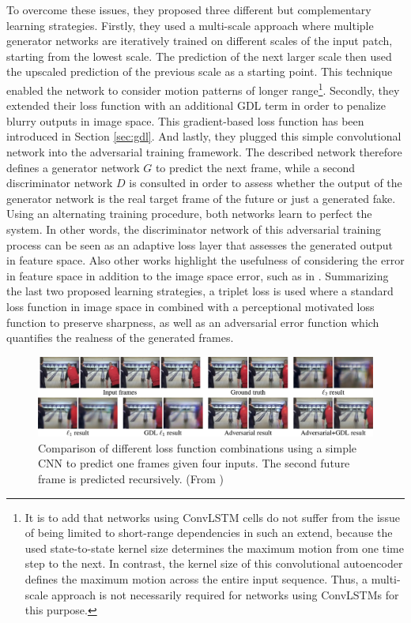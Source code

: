 To overcome these issues, they proposed three different but complementary learning strategies. Firstly, they used a multi-scale approach where multiple generator networks are iteratively trained on different scales of the input patch, starting from the lowest scale. The prediction of the next larger scale then used the upscaled prediction of the previous scale as a starting point. This technique enabled the network to consider motion patterns of longer range\footnote{It is to add that networks using ConvLSTM cells do not suffer from the issue of being limited to short-range dependencies in such an extend, because the used state-to-state kernel size determines the maximum motion from one time step to the next. In contrast, the kernel size of this convolutional autoencoder defines the maximum motion across the entire input sequence. Thus, a multi-scale approach is not necessarily required for networks using ConvLSTMs for this purpose.}. Secondly, they extended their loss function with an additional GDL term in order to penalize blurry outputs in image space. This gradient-based loss function has been introduced in Section \ref{sec:gdl}. And lastly, they plugged this simple convolutional network into the adversarial training framework. The described network therefore defines a generator network $G$ to predict the next frame, while a second discriminator network $D$ is consulted in order to assess whether the output of the generator network is the real target frame of the future or just a generated fake. Using an alternating training procedure, both networks learn to perfect the system. In other words, the discriminator network of this adversarial training process can be seen as an adaptive loss layer that assesses the generated output in feature space. Also other works highlight the usefulness of considering the error in feature space in addition to the image space error, such as in \parencite{gen_img_perc_sim}. Summarizing the last two proposed learning strategies, a triplet loss is used where a standard loss function in image space in combined with a perceptional motivated loss function to preserve sharpness, as well as an adversarial error function which quantifies the realness of the generated frames. 

\begin{figure}[htb]
	\centering
	\includegraphics[width=1.0\linewidth]{figures/related/deep_multiscale_samples.png} 
	\caption[Comparion of Loss Functions in GAN Model]{Comparison of different loss function combinations using a simple CNN to predict one frames given four inputs. The second future frame is predicted recursively. (From \parencite{deep_multiscale_video_pred})} \label{fig:gan_samples}
\end{figure}


